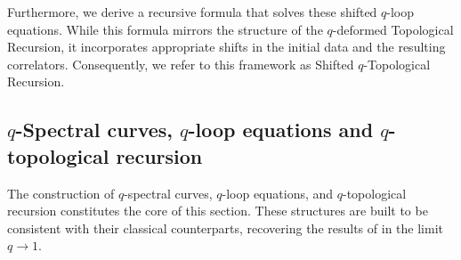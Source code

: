 \documentclass[reqno,11pt]{amsart}
\theoremstyle{plain}
\theoremstyle{definition}
\theoremstyle{remark}
\numberwithin{equation}{section}
\newcommand{\1}{\mathds{1}}
\newcommand{\2}{\frac{1}{2}}
\begin{document}
{				Furthermore, we derive a recursive formula that solves these shifted $q$-loop equations. While this formula mirrors the structure of the $q$-deformed Topological Recursion, it incorporates appropriate shifts in the initial data and the resulting correlators. Consequently, we refer to this framework as Shifted $q$-Topological Recursion.
				\subsection{$q$-Spectral curves, $q$-loop equations and $q$-topological recursion}
				The construction of $q$-spectral curves, $q$-loop equations, and $q$-topological recursion constitutes the core of this section. These structures are built to be consistent with their classical counterparts, recovering the results of \cite{BBCKS, Bo24} in the limit $q \to 1$.
				
}
\end{document}
